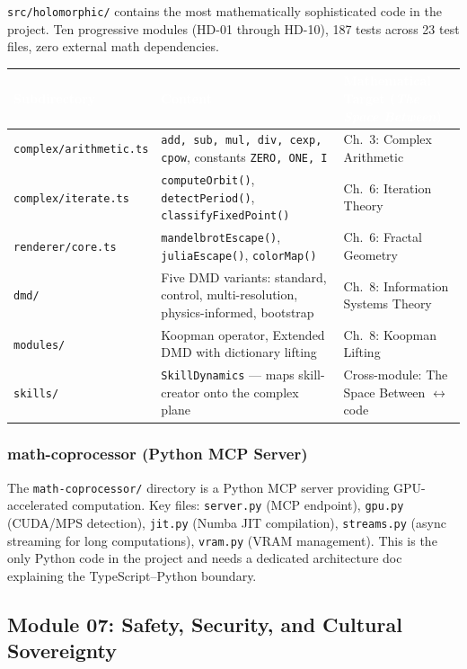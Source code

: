 \documentclass[11pt,letterpaper]{article}
\newcommand{\tableheader}[1]{\textbf{\sffamily\textcolor{white}{#1}}}
\begin{document}
\texttt{src/holomorphic/} contains the most mathematically sophisticated code in the project. Ten progressive modules (HD-01 through HD-10), 187 tests across 23 test files, zero external math dependencies.

\begin{center}
\begin{tabularx}{\textwidth}{L{3.5cm}L{3.5cm}X}
\toprule
{}
\tableheader{Subdirectory} & \tableheader{Content} & \tableheader{Mathematical Target (\textit{The Space Between})} \\
\midrule
\texttt{complex/arithmetic.ts} & \texttt{add, sub, mul, div, cexp, cpow}, constants \texttt{ZERO, ONE, I} & Ch.~3: Complex Arithmetic \\
\texttt{complex/iterate.ts} & \texttt{computeOrbit()}, \texttt{detectPeriod()}, \texttt{classifyFixedPoint()} & Ch.~6: Iteration Theory \\
\texttt{renderer/core.ts} & \texttt{mandelbrotEscape()}, \texttt{juliaEscape()}, \texttt{colorMap()} & Ch.~6: Fractal Geometry \\
\texttt{dmd/} & Five DMD variants: standard, control, multi-resolution, physics-informed, bootstrap & Ch.~8: Information Systems Theory \\
\texttt{modules/} & Koopman operator, Extended DMD with dictionary lifting & Ch.~8: Koopman Lifting \\
\texttt{skills/} & \texttt{SkillDynamics} --- maps skill-creator onto the complex plane & Cross-module: The Space Between $\leftrightarrow$ code \\
\bottomrule
\end{tabularx}
\end{center}

\subsubsection{math-coprocessor (Python MCP Server)}

The \texttt{math-coprocessor/} directory is a Python MCP server providing GPU-accelerated computation. Key files: \texttt{server.py} (MCP endpoint), \texttt{gpu.py} (CUDA/MPS detection), \texttt{jit.py} (Numba JIT compilation), \texttt{streams.py} (async streaming for long computations), \texttt{vram.py} (VRAM management). This is the only Python code in the project and needs a dedicated architecture doc explaining the TypeScript--Python boundary.

\subsection{Module 07: Safety, Security, and Cultural Sovereignty}
\end{document}
